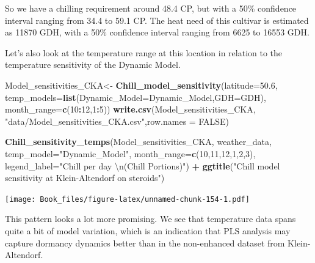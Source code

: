 \documentclass[
]{book}
\newenvironment{Shaded}{\begin{snugshade}}{\end{snugshade}}
\newcommand{\CharTok}[1]{\textcolor[rgb]{0.31,0.60,0.02}{#1}}
\newcommand{\DataTypeTok}[1]{\textcolor[rgb]{0.13,0.29,0.53}{#1}}
\newcommand{\DecValTok}[1]{\textcolor[rgb]{0.00,0.00,0.81}{#1}}
\newcommand{\FloatTok}[1]{\textcolor[rgb]{0.00,0.00,0.81}{#1}}
\newcommand{\KeywordTok}[1]{\textcolor[rgb]{0.13,0.29,0.53}{\textbf{#1}}}
\newcommand{\NormalTok}[1]{#1}
\newcommand{\OperatorTok}[1]{\textcolor[rgb]{0.81,0.36,0.00}{\textbf{#1}}}
\newcommand{\OtherTok}[1]{\textcolor[rgb]{0.56,0.35,0.01}{#1}}
\newcommand{\StringTok}[1]{\textcolor[rgb]{0.31,0.60,0.02}{#1}}
\begin{document}
So we have a chilling requirement around 48.4 CP, but with a 50\% confidence interval ranging from 34.4 to 59.1 CP. The heat need of this cultivar is estimated as 11870 GDH, with a 50\% confidence interval ranging from 6625 to 16553 GDH.

Let's also look at the temperature range at this location in relation to the temperature sensitivity of the Dynamic Model.

\begin{Shaded}
\begin{Highlighting}[]
\NormalTok{Model_sensitivities_CKA<-}
\StringTok{  }\KeywordTok{Chill_model_sensitivity}\NormalTok{(}\DataTypeTok{latitude=}\FloatTok{50.6}\NormalTok{,}
                          \DataTypeTok{temp_models=}\KeywordTok{list}\NormalTok{(}\DataTypeTok{Dynamic_Model=}\NormalTok{Dynamic_Model,}\DataTypeTok{GDH=}\NormalTok{GDH),}
                          \DataTypeTok{month_range=}\KeywordTok{c}\NormalTok{(}\DecValTok{10}\OperatorTok{:}\DecValTok{12}\NormalTok{,}\DecValTok{1}\OperatorTok{:}\DecValTok{5}\NormalTok{))}
\KeywordTok{write.csv}\NormalTok{(Model_sensitivities_CKA,}
          \StringTok{"data/Model_sensitivities_CKA.csv"}\NormalTok{,}\DataTypeTok{row.names =} \OtherTok{FALSE}\NormalTok{)}
\end{Highlighting}
\end{Shaded}

\begin{Shaded}
\begin{Highlighting}[]
\KeywordTok{Chill_sensitivity_temps}\NormalTok{(Model_sensitivities_CKA,}
\NormalTok{                        weather_data,}
                        \DataTypeTok{temp_model=}\StringTok{"Dynamic_Model"}\NormalTok{,}
                        \DataTypeTok{month_range=}\KeywordTok{c}\NormalTok{(}\DecValTok{10}\NormalTok{,}\DecValTok{11}\NormalTok{,}\DecValTok{12}\NormalTok{,}\DecValTok{1}\NormalTok{,}\DecValTok{2}\NormalTok{,}\DecValTok{3}\NormalTok{),}
                        \DataTypeTok{legend_label=}\StringTok{"Chill per day }\CharTok{\textbackslash{}n}\StringTok{(Chill Portions)"}\NormalTok{) }\OperatorTok{+}
\StringTok{  }\KeywordTok{ggtitle}\NormalTok{(}\StringTok{"Chill model sensitivity at Klein-Altendorf on steroids"}\NormalTok{)}
\end{Highlighting}
\end{Shaded}

\texttt{[image: Book\_files/figure-latex/unnamed-chunk-154-1.pdf]}

This pattern looks a lot more promising. We see that temperature data spans quite a bit of model variation, which is an indication that PLS analysis may capture dormancy dynamics better than in the non-enhanced dataset from Klein-Altendorf.
\end{document}
